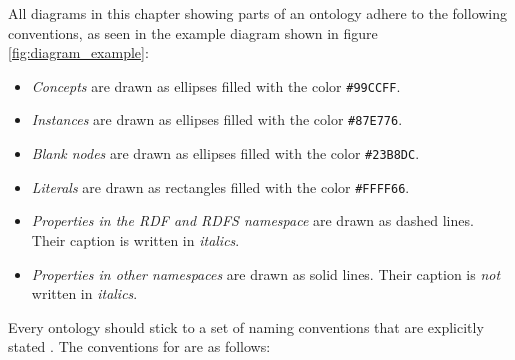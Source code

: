 All diagrams in this chapter showing parts of an ontology adhere to the following conventions, as seen in the example diagram shown in figure \ref{fig:diagram_example}:
\begin{itemize}
  \item \emph{Concepts} are drawn as ellipses filled with the color \texttt{\textcolor{convention_color1}{\#99CCFF}}.
  \item \emph{Instances} are drawn as ellipses filled with the color \texttt{\textcolor{convention_color2}{\#87E776}}.
  \item \emph{Blank nodes} are drawn as ellipses filled with the color \texttt{\textcolor{convention_color3}{\#23B8DC}}.
  \item \emph{Literals} are drawn as rectangles filled with the color \texttt{\colorbox{convention_color_bg4}{\textcolor{convention_color4}{\#FFFF66}}}.
  \item \emph{Properties in the RDF\cite{RDF} and RDFS\cite{RDFS} namespace} are drawn as dashed lines. Their caption is written in \emph{italics}.
  \item \emph{Properties in other namespaces} are drawn as solid lines. Their caption is \emph{not} written in \emph{italics}.
\end{itemize}

Every ontology should stick to a set of naming conventions that are explicitly stated \cite{Ontology101}. The conventions for \thinkhomeweather are as follows:


